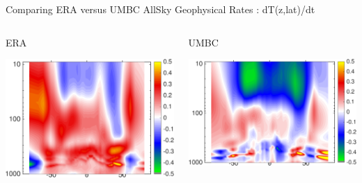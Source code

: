 \documentclass[10pt,t]{beamer}
\begin{document}
\begin{frame}{Comparing ERA versus UMBC AllSky Geophysical Rates : dT(z,lat)/dt}
\vspace{-0.35in}

\begin{columns}
\begin{column}{0.55\columnwidth}
\begin{block}{\footnotesize ERA}
\vspace{-0.1in}
\begin{center}
\includegraphics[width=0.925\linewidth]{Figs/CloudAnom/Desc_ocean/ak_x_ERAtzrates.png}
\end{center}
\end{block}
\end{column}

\begin{column}{0.55\columnwidth}
\begin{block}{\footnotesize UMBC}
\vspace{-0.1in}
\begin{center}
\includegraphics[width=\linewidth]{Figs/CloudAnom/Desc_ocean/tz_lat_p_rates_from_obs_specral_rates.png}
\end{center}
\end{block}
\end{column}
\end{columns}


\end{frame}
\end{document}
